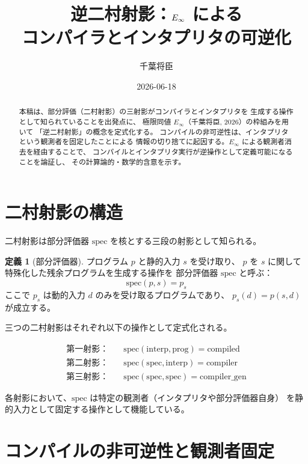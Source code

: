 \documentclass[11pt,a4paper]{article}
\title{逆二村射影：$\Einfty$ による\\
コンパイラとインタプリタの可逆化}
\author{千葉将臣}
\date{2026-06-18}
\newcommand{\Einfty}{E_\infty}
\theoremstyle{definition}
\newtheorem{definition}{定義}[section]
\begin{document}
\maketitle

\begin{abstract}
本稿は、部分評価（二村射影）の三射影がコンパイラとインタプリタを
生成する操作として知られていることを出発点に、
極限同値 $\Einfty$（千葉将臣, 2026）の枠組みを用いて
「逆二村射影」の概念を定式化する。
コンパイルの非可逆性は、インタプリタという観測者を固定したことによる
情報の切り捨てに起因する。$\Einfty$ による観測者消去を経由することで、
コンパイルとインタプリタ実行が逆操作として定義可能になることを論証し、
その計算論的・数学的含意を示す。
\end{abstract}

\section{二村射影の構造}

二村射影は部分評価器 $\mathrm{spec}$ を核とする三段の射影として知られる。

\begin{definition}[部分評価器]
プログラム $p$ と静的入力 $s$ を受け取り、
$p$ を $s$ に関して特殊化した残余プログラムを生成する操作を
部分評価器 $\mathrm{spec}$ と呼ぶ：
$$\mathrm{spec}(p, s) = p_s$$
ここで $p_s$ は動的入力 $d$ のみを受け取るプログラムであり、
$p_s(d) = p(s, d)$ が成立する。
\end{definition}

三つの二村射影はそれぞれ以下の操作として定式化される。

\begin{align}
\text{第一射影：} & \quad \mathrm{spec}(\text{interp}, \text{prog}) = \text{compiled} \label{eq:proj1} \\
\text{第二射影：} & \quad \mathrm{spec}(\mathrm{spec}, \text{interp}) = \text{compiler} \label{eq:proj2} \\
\text{第三射影：} & \quad \mathrm{spec}(\mathrm{spec}, \mathrm{spec}) = \text{compiler\_gen} \label{eq:proj3}
\end{align}

各射影において、$\mathrm{spec}$ は特定の観測者（インタプリタや部分評価器自身）
を静的入力として固定する操作として機能している。

\section{コンパイルの非可逆性と観測者固定}
\end{document}
